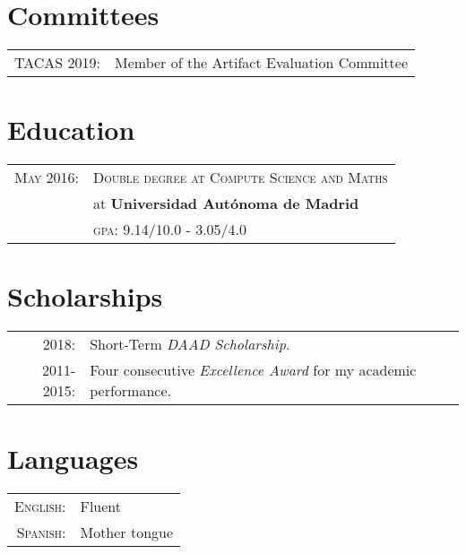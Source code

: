 \documentclass[a4paper,10pt]{article} %
\begin{document}

\section{Committees}
\begin{tabular}{rl}

\textsc{TACAS} 2019: & Member of the Artifact Evaluation Committee
\end{tabular}


\section{Education}
\begin{tabular}{rl}

\textsc{May} 2016: & \textsc{Double degree at Compute Science and Maths}\\
& at \textbf{Universidad Autónoma de Madrid} \\
& \normalsize \textsc{gpa}: 9.14/10.0 - 3.05/4.0\\
\end{tabular}


\section{Scholarships}

\begin{tabular}{rl}

\textsc{2018}: & Short-Term \emph{DAAD Scholarship}. \\

\textsc{2011-2015}: & Four consecutive \emph{Excellence Award} for my academic performance. \\

\end{tabular}


\section{Languages}

\begin{tabular}{rl}
\textsc{English:} & Fluent\\

\textsc{Spanish:} & Mother tongue\\

\end{tabular}

\end{document}
